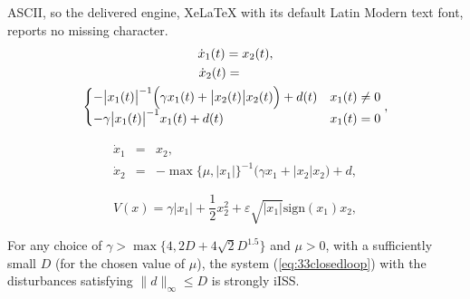 \documentclass[10pt,a4paper]{amsart}
\begin{document}
ASCII, so the delivered engine, XeLaTeX with its default Latin Modern text font, reports no missing character.
\begin{gather}
\dot{x}_1(t)=x_{2}(t),\label{eq:CLoriginal}\\
\dot{x}_2(t)=\qquad\;\;\nonumber \\
\begin{cases}
-\bigl|x_{1}(t)\bigr|^{-1}\Bigl(\gamma x_{1}(t)+\bigl|x_{2}(t)\bigr|x_{2}(t)\Bigr)+d(t) & x_{1}(t)\ne0\\
-\gamma\bigl|x_{1}(t)\bigr|^{-1}x_{1}(t)+d(t) & x_{1}(t)=0
\end{cases},\nonumber
\end{gather}

\begin{eqnarray}
\dot{x}_{1} & = & x_{2},\label{eq:33closedloop}\\
\dot{x}_{2} & = & -\max\bigl\{\mu,\bigl|x_{1}\bigr|\bigr\}^{-1}\bigl(\gamma x_{1}+\bigl|x_{2}\bigr|x_{2}\bigr)+d,\nonumber 
\end{eqnarray}

\begin{equation}
V(x)=\gamma|x_{1}|+\frac{1}{2}x_{2}^{2}+\varepsilon\sqrt{|x_{1}|}\text{sign}(x_{1})x_{2},\label{eq:Lyapunov0}
\end{equation}

\begin{theorem}
For any choice of $\gamma>\max\{4,2D+4\sqrt{2}D^{1.5}\}$ and $\mu>0$,
with a sufficiently small $D$ (for the chosen value of $\mu$), the system (\ref{eq:33closedloop})
with the disturbances satisfying $\|d\|_{\infty}\leq D$ is strongly
iISS.
\end{theorem}
\end{document}
